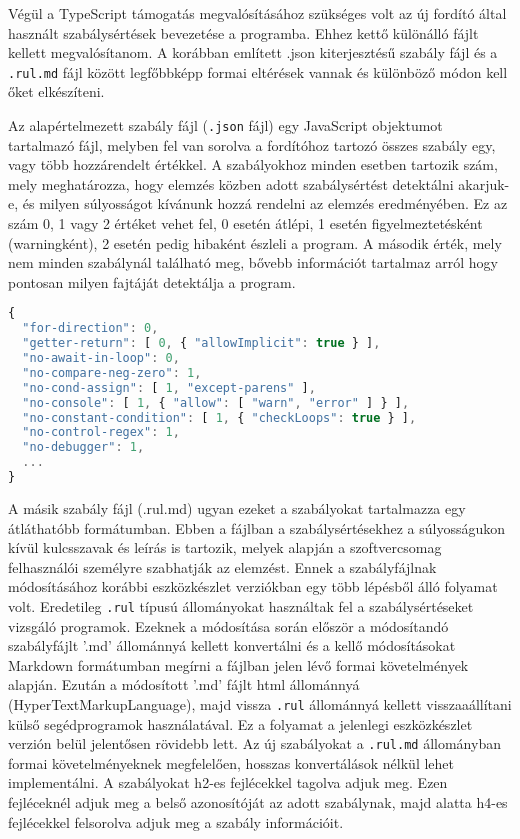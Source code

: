 Végül a TypeScript támogatás megvalósításához szükséges volt az új fordító által használt szabálysértések bevezetése a programba. Ehhez kettő különálló fájlt kellett megvalósítanom. A korábban említett .json kiterjesztésű szabály fájl és a \texttt{.rul.md} fájl között legfőbbképp formai eltérések vannak és különböző módon kell őket elkészíteni.

Az alapértelmezett szabály fájl (\texttt{.json} fájl) egy JavaScript objektumot tartalmazó fájl, melyben fel van sorolva a fordítóhoz tartozó összes szabály egy, vagy több hozzárendelt értékkel. A szabályokhoz minden esetben tartozik szám, mely meghatározza, hogy elemzés közben adott szabálysértést detektálni akarjuk-e, és milyen súlyosságot kívánunk hozzá rendelni az elemzés eredményében. Ez az szám 0, 1 vagy 2 értéket vehet fel, 0 esetén átlépi, 1 esetén figyelmeztetésként (warningként), 2 esetén pedig hibaként észleli a program. A második érték, mely nem minden szabálynál található meg, bővebb információt tartalmaz arról hogy pontosan milyen fajtáját detektálja a program. 

\begin{lstlisting}[caption={Szabálysértések megadása .json állományban},label={lst:jsonconfig}, language={JavaScript}]
{ 
  "for-direction": 0,
  "getter-return": [ 0, { "allowImplicit": true } ],
  "no-await-in-loop": 0,
  "no-compare-neg-zero": 1,
  "no-cond-assign": [ 1, "except-parens" ],
  "no-console": [ 1, { "allow": [ "warn", "error" ] } ],
  "no-constant-condition": [ 1, { "checkLoops": true } ],
  "no-control-regex": 1,
  "no-debugger": 1,
  ...
}
\end{lstlisting}

A másik szabály fájl (.rul.md) ugyan ezeket a szabályokat tartalmazza egy átláthatóbb formátumban. Ebben a fájlban a szabálysértésekhez a súlyosságukon kívül kulcsszavak és leírás is tartozik, melyek alapján a szoftvercsomag felhasználói személyre szabhatják az elemzést.
Ennek a szabályfájlnak módosításához korábbi eszközkészlet verziókban egy több lépésből álló folyamat volt. Eredetileg \texttt{.rul} típusú állományokat használtak fel a szabálysértéseket vizsgáló programok. Ezeknek a módosítása során először a módosítandó szabályfájlt '.md' állománnyá kellett konvertálni és a kellő módosításokat Markdown formátumban megírni a fájlban jelen lévő formai követelmények alapján. Ezután a módosított '.md' fájlt html állománnyá (HyperTextMarkupLanguage), majd vissza \texttt{.rul} állománnyá kellett visszaaállítani külső segédprogramok használatával.
Ez a folyamat a jelenlegi eszközkészlet verzión belül jelentősen rövidebb lett. Az új szabályokat a \texttt{.rul.md} állományban formai követelményeknek megfelelően, hosszas konvertálások nélkül lehet implementálni. A szabályokat h2-es fejlécekkel tagolva adjuk meg. Ezen fejléceknél adjuk meg a belső azonosítóját az adott szabálynak, majd alatta h4-es fejlécekkel felsorolva adjuk meg a szabály információit. 


